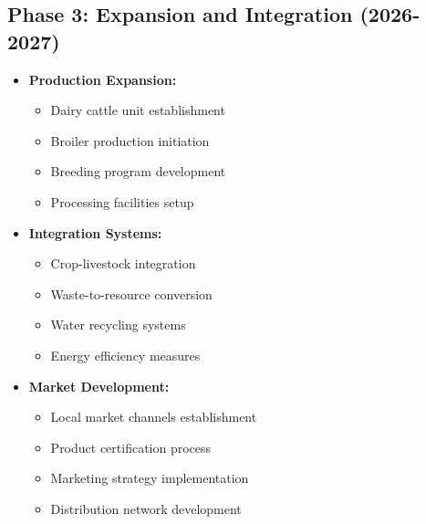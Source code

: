 \subsection{Phase 3: Expansion and Integration (2026-2027)}
\begin{itemize}
    \item \textbf{Production Expansion:}
    \begin{itemize}
        \item Dairy cattle unit establishment
        \item Broiler production initiation
        \item Breeding program development
        \item Processing facilities setup
    \end{itemize}
    
    \item \textbf{Integration Systems:}
    \begin{itemize}
        \item Crop-livestock integration
        \item Waste-to-resource conversion
        \item Water recycling systems
        \item Energy efficiency measures
    \end{itemize}
    
    \item \textbf{Market Development:}
    \begin{itemize}
        \item Local market channels establishment
        \item Product certification process
        \item Marketing strategy implementation
        \item Distribution network development
    \end{itemize}
\end{itemize}

